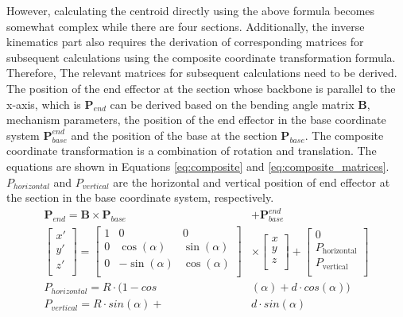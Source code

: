 However, calculating the centroid directly using the above formula becomes somewhat complex while there are four sections. 
Additionally, the inverse kinematics part also requires the derivation of corresponding matrices for subsequent calculations 
using the composite coordinate transformation formula. Therefore, The relevant matrices for subsequent calculations need to 
be derived. 
The position of the end effector at the section whose backbone is parallel to the x-axis, which is $\textbf{P}_{end}$ can be 
derived based on the bending angle matrix $\textbf{B}$, mechanism parameters, the position of the end effector in the base 
coordinate system $\textbf{P}_{base}^{end}$ and the position of the base at the section $\textbf{P}_{base}$. The composite 
coordinate transformation is a combination of rotation and translation. The equations are shown in Equations \ref{eq:composite} 
and \ref{eq:composite_matrices}. $P_{horizontal}$ and $P_{vertical}$ are the horizontal and vertical position of end effector 
at the section in the base coordinate system, respectively. 
\begin{align}
    \textbf{P}_{end} = \textbf{B} \times \textbf{P}_{base} &+ \textbf{P}_{base}^{end} \label{eq:composite} \\
    \begin{bmatrix}
        x' \\
        y' \\
        z' \\
    \end{bmatrix}
    =
    \begin{bmatrix}
        1 & 0 & 0 \\
        0 & \cos(\alpha) & \sin(\alpha) \\
        0 & -\sin(\alpha) & \cos(\alpha) \\
    \end{bmatrix}
    &\times
    \begin{bmatrix}
        x \\
        y \\
        z \\
    \end{bmatrix}
    +
    \begin{bmatrix}
        0 \\
        P_{\text{horizontal}} \\
        P_{\text{vertical}} \\
    \end{bmatrix}\label{eq:composite_matrices} \\
    P_{horizontal} = R\cdot(1-cos&(\alpha) + d\cdot cos(\alpha)) \nonumber \\ 
    P_{vertical} = R\cdot sin(\alpha) + &d\cdot sin(\alpha) \nonumber
\end{align}

